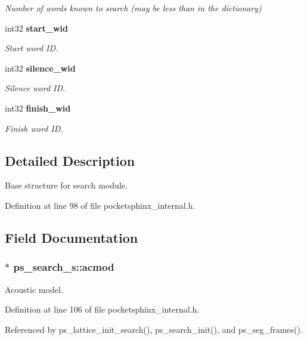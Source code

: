 \begin{DoxyCompactItemize}
\begin{DoxyCompactList}\small\item\em Number of words known to search (may be less than in the dictionary) \end{DoxyCompactList}\item 
int32 {\bf start\-\_\-wid}
\begin{DoxyCompactList}\small\item\em Start word I\-D. \end{DoxyCompactList}\item 
int32 {\bf silence\-\_\-wid}
\begin{DoxyCompactList}\small\item\em Silence word I\-D. \end{DoxyCompactList}\item 
int32 {\bf finish\-\_\-wid}
\begin{DoxyCompactList}\small\item\em Finish word I\-D. \end{DoxyCompactList}\end{DoxyCompactItemize}


\subsection{Detailed Description}
Base structure for search module. 

Definition at line 98 of file pocketsphinx\-\_\-internal.\-h.



\subsection{Field Documentation}
\subsubsection[{acmod}]{$\ast$ ps\-\_\-search\-\_\-s\-::acmod}\label{structps__search__s_a0fdf6fe8c4d9c28f10c48c09517c6b91}


Acoustic model. 



Definition at line 106 of file pocketsphinx\-\_\-internal.\-h.



Referenced by ps\-\_\-lattice\-\_\-init\-\_\-search(), ps\-\_\-search\-\_\-init(), and ps\-\_\-seg\-\_\-frames().

